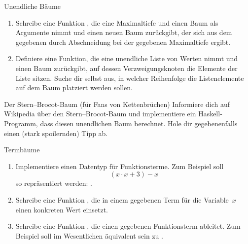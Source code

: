 \documentclass{uebblatt}
\begin{document}
\begin{aufgabe}{Unendliche Bäume}
\begin{enumerate}
\item Schreibe eine Funktion , die eine
Maximaltiefe und einen Baum als Argumente nimmt und einen neuen Baum
zurückgibt, der sich aus dem gegebenen durch Abschneidung bei der gegebenen
Maximaltiefe ergibt.
\item Definiere eine Funktion, die eine unendliche Liste von Werten nimmt und
einen Baum zurückgibt, auf dessen Verzweigungsknoten die Elemente der Liste
sitzen. Suche dir selbst aus, in welcher Reihenfolge die Listenelemente auf dem
Baum platziert werden sollen.
\end{enumerate}
\end{aufgabe}

\begin{aufgabe}{Der Stern--Brocot-Baum (für Fans von Kettenbrüchen)}
Informiere dich auf Wikipedia über den Stern--Brocot-Baum und implementiere ein
Haskell-Programm, dass diesen unendlichen Baum berechnet. Hole dir
gegebenenfalls einen (stark spoilernden) Tipp ab.
\end{aufgabe}

\begin{aufgabe}{Termbäume}
\begin{enumerate}
\item Implementiere einen Datentyp für Funktionsterme. Zum Beispiel soll
\[ (x \cdot x + 3) - x \]
so repräsentiert werden: .
\item Schreibe eine Funktion ,
die in einem gegebenen Term für die Variable~$x$ einen konkreten Wert einsetzt.
\item Schreibe eine Funktion , die
einen gegebenen Funktionsterm ableitet. Zum Beispiel soll  im Wesentlichen äquivalent sein zu .
\end{enumerate}
\end{aufgabe}
\end{document}
